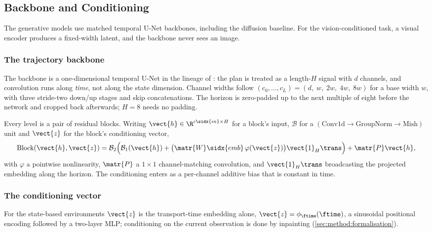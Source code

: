 \subsection{Backbone and Conditioning}\label{sec:method:backbone}

The generative models use matched temporal U-Net backbones, including the diffusion baseline. For the vision-conditioned task, a visual encoder produces a fixed-width latent, and the
backbone never sees an image.

\subsubsection*{The trajectory backbone}

The backbone is a one-dimensional temporal U-Net in the lineage of
\parencite{janner2022planning}: the plan is treated as a length-$H$ signal with $d$ channels,
and convolution runs along \emph{time}, not along the state dimension. Channel widths follow
$\left(c_{0},\dots,c_{L}\right) = \left(d,\;w,\;2w,\;4w,\;8w\right)$ for a base width $w$, with
three stride-two down/up stages and skip concatenations. The horizon is zero-padded up to the next
multiple of eight before the network and cropped back afterwards; $H = 8$ needs no padding.

Every level is a pair of residual blocks. Writing $\vect{h}\in\R^{c\sidx{in}\times H}$ for a block's
input, $\mathcal{B}$ for a $\left(\text{Conv1d}\to\text{GroupNorm}\to\text{Mish}\right)$ unit and
$\vect{z}$ for the block's conditioning vector,
\begin{equation}\label{eq:method:backbone:block}
  \operatorname{Block}(\vect{h},\vect{z})
  = \mathcal{B}_{2}\Big(\mathcal{B}_{1}(\vect{h}) + \big(\matr{W}\sidx{emb}\,\varphi(\vect{z})\big)\vect{1}_{H}\trans\Big)
    + \matr{P}\vect{h},
\end{equation}
with $\varphi$ a pointwise nonlinearity, $\matr{P}$ a $1\times1$ channel-matching convolution, and
$\vect{1}_{H}\trans$ broadcasting the projected embedding along the horizon. The conditioning
enters as a per-channel additive bias that is constant in time.

\subsubsection*{The conditioning vector}

For the state-based environments $\vect{z}$ is the transport-time embedding alone,
$\vect{z} = \phi_{\ftime}(\ftime)$, a sinusoidal positional encoding followed by a two-layer MLP;
conditioning on the current observation is done by inpainting
(\autoref{sec:method:formalisation}).


